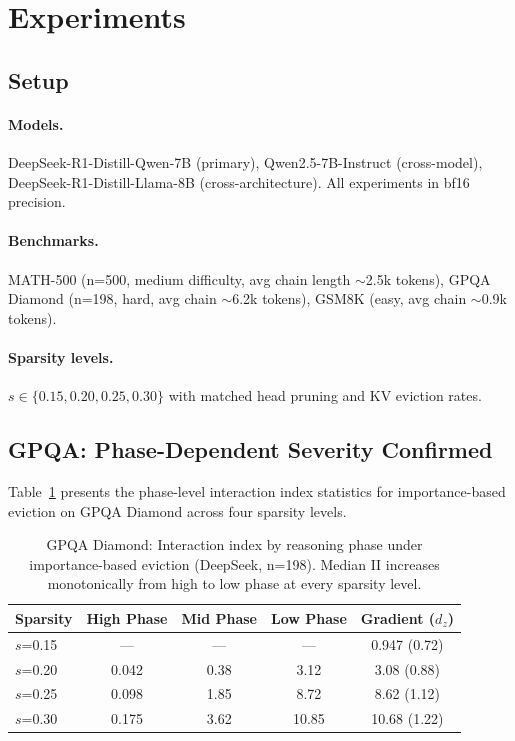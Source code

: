 \documentclass[11pt,a4paper]{article}
\begin{document}
\section{Experiments}

\subsection{Setup}

\paragraph{Models.} DeepSeek-R1-Distill-Qwen-7B (primary), Qwen2.5-7B-Instruct (cross-model), DeepSeek-R1-Distill-Llama-8B (cross-architecture). All experiments in bf16 precision.

\paragraph{Benchmarks.} MATH-500 (n=500, medium difficulty, avg chain length $\sim$2.5k tokens), GPQA Diamond (n=198, hard, avg chain $\sim$6.2k tokens), GSM8K (easy, avg chain $\sim$0.9k tokens).

\paragraph{Sparsity levels.} $s \in \{0.15, 0.20, 0.25, 0.30\}$ with matched head pruning and KV eviction rates.

\subsection{GPQA: Phase-Dependent Severity Confirmed}

Table~\ref{tab:gpqa_importance} presents the phase-level interaction index statistics for importance-based eviction on GPQA Diamond across four sparsity levels.

\begin{table}[h]
\centering
\caption{GPQA Diamond: Interaction index by reasoning phase under importance-based eviction (DeepSeek, n=198). Median II increases monotonically from high to low phase at every sparsity level.}
\label{tab:gpqa_importance}
\begin{tabular}{lcccc}
\toprule
Sparsity & High Phase & Mid Phase & Low Phase & Gradient ($d_z$) \\
\midrule
$s$=0.15 & --- & --- & --- & 0.947 (0.72) \\
$s$=0.20 & 0.042 & 0.38 & 3.12 & 3.08 (0.88) \\
$s$=0.25 & 0.098 & 1.85 & 8.72 & 8.62 (1.12) \\
$s$=0.30 & 0.175 & 3.62 & 10.85 & 10.68 (1.22) \\
\bottomrule
\end{tabular}
\end{table}
\end{document}
